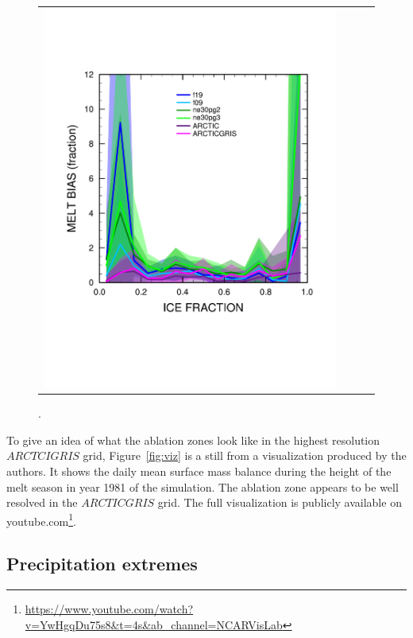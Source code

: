 \documentclass[draft]{agujournal2019}
\begin{document}
\begin{figure}[t]
\begin{center}
\begin{tabular}{cccc}
         \includegraphics[width=100mm]{figs/temp_xy_diffRACMO_melt.pdf}
\end{tabular}
\end{center}
\caption{.}
\label{fig:bias}
\end{figure}

To give an idea of what the ablation zones look like in the highest resolution $ARCTCIGRIS$ grid, Figure~\ref{fig:viz} is a still from a visualization produced by the authors. It shows the daily mean surface mass balance during the height of the melt season in year 1981 of the simulation. The ablation zone appears to be well resolved in the $ARCTICGRIS$ grid. The full visualization is publicly available on youtube.com\footnote{\url{https://www.youtube.com/watch?v=YwHgqDu75s8&t=4s&ab_channel=NCARVisLab}}.


\subsection{Precipitation extremes}
\end{document}
